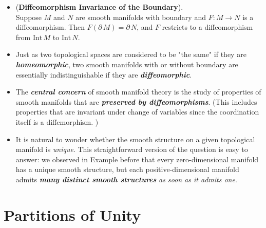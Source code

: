 \documentclass[11pt]{article}
\begin{document}
\begin{itemize}
\item \begin{theorem} (\textbf{Diffeomorphism Invariance of the Boundary}). \\
Suppose $M$ and $N$ are smooth manifolds with boundary and $F: M \rightarrow N$ is a diffeomorphism. Then $F(\partial\,M) = \partial\,N$, and $F$ restricts to a diffeomorphism from $\text{Int}\,M$ to $\text{Int}\,N$.
\end{theorem}

\item Just as two topological spaces are considered to be "the same" if they are \emph{\textbf{homeomorphic}}, two smooth manifolds with or without boundary are essentially indistinguishable if they are \emph{\textbf{diffeomorphic}}.

\item The \emph{\textbf{central concern}} of smooth manifold theory is the study of properties of smooth manifolds that are \emph{\textbf{preserved by diffeomorphisms}}. (This includes properties that are invariant under change of variables since the coordination itself is a diffemorphism. )

\item It is natural to wonder whether the smooth structure on a given topological manifold is \emph{unique}. This straightforward version of the question is easy to answer: we observed in Example before that every zero-dimensional manifold has a unique smooth structure, but each positive-dimensional manifold admits \emph{\textbf{many distinct smooth structures}} \emph{as soon as it admits one}.
\end{itemize}

\section{Partitions of Unity}
\end{document}
